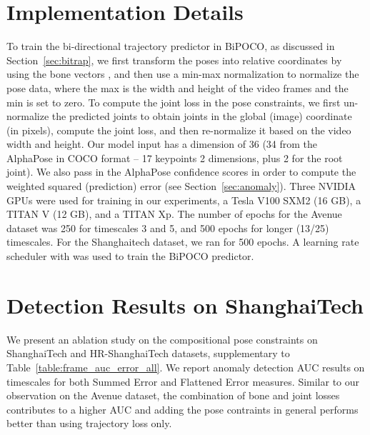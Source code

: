\documentclass[nohyperref]{article}
\theoremstyle{plain}
\theoremstyle{definition}
\theoremstyle{remark}
\begin{document}
\section{Implementation Details}
\label{appendix:implementation}



To train the bi-directional trajectory predictor in BiPOCO,  as discussed in Section~\ref{sec:bitrap}, we first transform the poses into relative coordinates by using the bone vectors , and then use a min-max normalization to normalize the pose data, where the max is the width and height of the video frames and the min is set to zero. To compute the joint loss in the pose constraints, we first un-normalize the predicted joints to obtain joints in the global (image) coordinate (in pixels), compute the joint loss, and then re-normalize it based on the video width and height. Our model input has a dimension of 36 (34 from the AlphaPose in COCO format -- 17 keypoints  2 dimensions, plus 2 for the root joint). We also pass in the AlphaPose confidence scores in order to compute the weighted squared (prediction) error (see Section~\ref{sec:anomaly}). Three NVIDIA GPUs were used for training in our experiments, a Tesla V100 SXM2 (16 GB), a TITAN V (12 GB), and a TITAN Xp. The  number of epochs for the Avenue dataset was 250 for timescales 3 and 5, and 500 epochs for longer (13/25) timescales. For the Shanghaitech dataset, we ran for 500 epochs. A learning rate scheduler with 
 was used to train the BiPOCO predictor.



\section{Detection Results on ShanghaiTech}
\label{appendix:st}

We present an ablation study on the compositional pose constraints on ShanghaiTech and HR-ShanghaiTech datasets,  supplementary to Table~\ref{table:frame_auc_error_all}. We report anomaly detection AUC results on timescales  for both Summed Error and Flattened Error measures. Similar to our observation on the Avenue dataset, the combination of bone and joint losses contributes to a higher AUC and adding the pose contraints in general performs better than using trajectory loss only.
\end{document}
